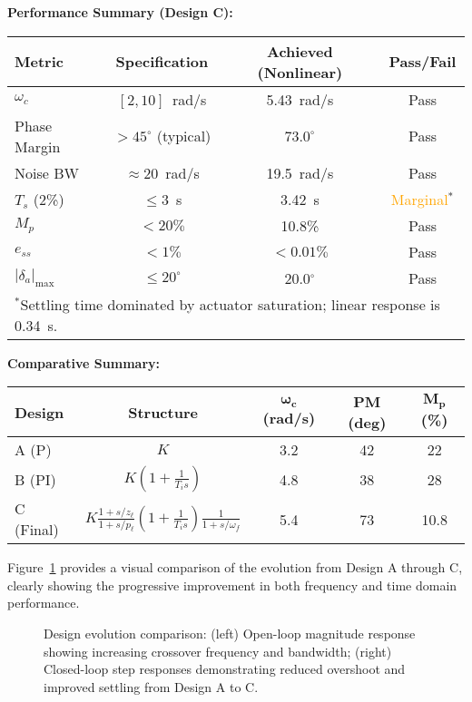 \textbf{Performance Summary (Design C):}
\begin{center}
\begin{tabular}{lccc}
\hline
\textbf{Metric} & \textbf{Specification} & \textbf{Achieved (Nonlinear)} & \textbf{Pass/Fail} \\
\hline
$\omega_c$ & $[2,10]$~rad/s & 5.43~rad/s & \textcolor{green!60!black}{Pass} \\
Phase Margin & $>45^\circ$ (typical) & $73.0^\circ$ & \textcolor{green!60!black}{Pass} \\
Noise BW & $\approx 20$~rad/s & 19.5~rad/s & \textcolor{green!60!black}{Pass} \\
$T_s$ (2\%) & $\le 3$~s & 3.42~s & \textcolor{orange}{Marginal}$^*$ \\
$M_p$ & $<20\%$ & 10.8\% & \textcolor{green!60!black}{Pass} \\
$e_{ss}$ & $<1\%$ & $<0.01\%$ & \textcolor{green!60!black}{Pass} \\
$|\delta_a|_{\max}$ & $\le 20^\circ$ & 20.0$^\circ$ & \textcolor{green!60!black}{Pass} \\
\hline
\multicolumn{4}{l}{$^*$Settling time dominated by actuator saturation; linear response is 0.34~s.}
\end{tabular}
\end{center}

\textbf{Comparative Summary:}
\begin{center}
\begin{tabular}{lcccc}
\hline
\textbf{Design} & \textbf{Structure} & $\boldsymbol{\omega_c}$ \textbf{(rad/s)} & \textbf{PM (deg)} & $\boldsymbol{M_p}$ \textbf{(\%)} \\
\hline
A (P) & $K$ & 3.2 & 42 & 22 \\
B (PI) & $K(1+\tfrac{1}{T_i s})$ & 4.8 & 38 & 28 \\
C (Final) & $K\tfrac{1+s/z_\ell}{1+s/p_\ell}(1+\tfrac{1}{T_i s})\tfrac{1}{1+s/\omega_f}$ & 5.4 & 73 & 10.8 \\
\hline
\end{tabular}
\end{center}

Figure~\ref{fig:design_comparison} provides a visual comparison of the evolution from Design A through C, clearly showing the progressive improvement in both frequency and time domain performance.

\begin{figure}[h!]
\centering
\resizebox{0.95\textwidth}{!}{}
\caption{Design evolution comparison: (left) Open-loop magnitude response showing increasing crossover frequency and bandwidth; (right) Closed-loop step responses demonstrating reduced overshoot and improved settling from Design A to C.}
\label{fig:design_comparison}
\end{figure}

